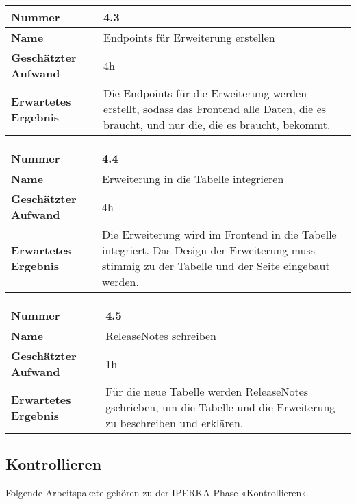 \begin{longtable}{p{}|p{}}
	\hline
	\textbf{Nummer}                 & \textbf{4.3}            \\
	\hline
	\textbf{Name}   				& Endpoints für Erweiterung erstellen                  \\
	\hline
	\textbf{Geschätzter Aufwand}    & 4h                                    \\
	\hline
	\textbf{Erwartetes Ergebnis}    & Die Endpoints für die Erweiterung werden erstellt, sodass das Frontend alle Daten, die es braucht, und nur die, die es braucht, bekommt.                                    \\
	\hline
\end{longtable}\label{tab:realisieren-4.3}

\begin{longtable}{p{}|p{}}
	\hline
	\textbf{Nummer}                 & \textbf{4.4}            \\
	\hline
	\textbf{Name}   				& Erweiterung in die Tabelle integrieren                  \\
	\hline
	\textbf{Geschätzter Aufwand}    & 4h                                    \\
	\hline
	\textbf{Erwartetes Ergebnis}    & Die Erweiterung wird im Frontend in die Tabelle integriert. Das Design der Erweiterung muss stimmig zu der Tabelle und der Seite eingebaut werden.                                    \\
	\hline
\end{longtable}\label{tab:realisieren-4.4}

\begin{longtable}{p{}|p{}}
	\hline
	\textbf{Nummer}                 & \textbf{4.5}            \\
	\hline
	\textbf{Name}   				& ReleaseNotes schreiben                  \\
	\hline
	\textbf{Geschätzter Aufwand}    & 1h                                    \\
	\hline
	\textbf{Erwartetes Ergebnis}    & Für die neue Tabelle werden ReleaseNotes gschrieben, um die Tabelle und die Erweiterung zu beschreiben und erklären.                                    \\
	\hline
\end{longtable}\label{tab:realisieren-4.5}

\subsection{Kontrollieren}
Folgende Arbeitspakete gehören zu der IPERKA-Phase «Kontrollieren».

